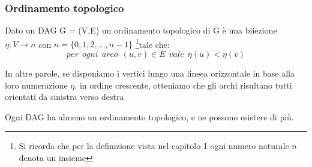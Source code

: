\subsubsection{Ordinamento topologico}
\begin{definition}
    Dato un DAG G = (V,E) un ordinamento topologico di G è una biiezione $\eta: V \to n$ con $n = \{0,1,2,..., n-1\}$ \footnote{Si ricorda che per la definizione vista nel capitolo 1 ogni numero naturale $n$ denota un insieme}tale che:
    \begin{equation}
        per \:\: ogni \:\: arco \:\: (u,v) \in E \:\: vale \:\: \eta(u) < \eta(v)
    \end{equation}
\end{definition}
\hspace{-15pt}In altre parole, se disponiamo i vertici lungo una lineea orizzontale in base alla loro numerazione $\eta$, in ordine crescente, otteniamo che gli archi risultano tutti orientati da sinistra verso destra
\begin{proposition}
    Ogni DAG ha almeno un ordinamento topologico, e ne possono esistere di più.
\end{proposition}

